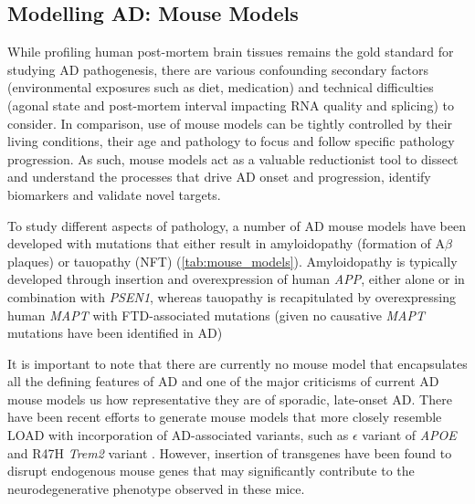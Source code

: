 


\clearpage
\subsection{Modelling AD: Mouse Models}
While profiling human post-mortem brain tissues remains the gold standard for studying AD pathogenesis, there are various confounding secondary factors (environmental exposures such as diet, medication) and technical difficulties (agonal state and post-mortem interval impacting RNA quality and splicing) to consider. In comparison, use of mouse models can be tightly controlled by their living conditions, their age and pathology to focus and follow specific pathology progression. As such, mouse models act as a valuable reductionist tool to dissect and understand the processes that drive AD onset and progression, identify biomarkers and validate novel targets\cite{Hall2012}. 

To study different aspects of pathology, a number of AD mouse models have been developed with mutations that either result in amyloidopathy (formation of A$\beta$ plaques) or tauopathy (NFT) (\cref{tab:mouse_models}). Amyloidopathy is typically developed through insertion and overexpression of human \textit{APP}, either alone or in combination with \textit{PSEN1}, whereas tauopathy is recapitulated by overexpressing human \textit{MAPT} with FTD-associated mutations (given no causative \textit{MAPT} mutations have been identified in AD)

It is important to note that there are currently no mouse model that encapsulates all the defining features of AD and one of the major criticisms of current AD mouse models us how representative they are of sporadic, late-onset AD. There have been recent efforts to generate mouse models that more closely resemble LOAD with incorporation of AD-associated variants, such as $\epsilon$ variant of \textit{APOE} and R47H \textit{Trem2} variant \cite{apoe4trem2_mousemodel,Lewandowski2020}. However, insertion of transgenes have been found to disrupt endogenous mouse genes that may significantly contribute to the neurodegenerative phenotype observed in these mice. 


